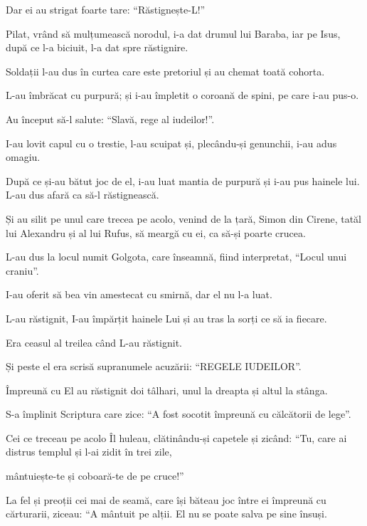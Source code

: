 {\par }{\PP Dar ei au strigat foarte tare: “Răstignește-L!”


\par }{\PP {}Pilat, vrând să mulțumească norodul, i-a dat drumul lui Baraba, iar pe Isus, după ce l-a biciuit, l-a dat spre răstignire.


\par }{\PP {}Soldații l-au dus în curtea care este pretoriul și au chemat toată cohorta.

L-au îmbrăcat cu purpură; și i-au împletit o coroană de spini, pe care i-au pus-o.

Au început să-l salute: “Slavă, rege al iudeilor!”.

I-au lovit capul cu o trestie, l-au scuipat și, plecându-și genunchii, i-au adus omagiu.

După ce și-au bătut joc de el, i-au luat mantia de purpură și i-au pus hainele lui. L-au dus afară ca să-l răstignească.


\par }{\PP {}Și au silit pe unul care trecea pe acolo, venind de la țară, Simon din Cirene, tatăl lui Alexandru și al lui Rufus, să meargă cu ei, ca să-și poarte crucea.

L-au dus la locul numit Golgota, care înseamnă, fiind interpretat, “Locul unui craniu”.

I-au oferit să bea vin amestecat cu smirnă, dar el nu l-a luat.


\par }{\PP {}L-au răstignit, I-au împărțit hainele Lui și au tras la sorți ce să ia fiecare.

Era ceasul al treilea când L-au răstignit.

Și peste el era scrisă supranumele acuzării: “REGELE IUDEILOR”.

Împreună cu El au răstignit doi tâlhari, unul la dreapta și altul la stânga.

S-a împlinit Scriptura care zice: “A fost socotit împreună cu călcătorii de lege”.


\par }{\PP {}Cei ce treceau pe acolo Îl huleau, clătinându-și capetele și zicând: “Tu, care ai distrus templul și l-ai zidit în trei zile,

mântuiește-te și coboară-te de pe cruce!”


\par }{\PP {}La fel și preoții cei mai de seamă, care își băteau joc între ei împreună cu cărturarii, ziceau: “A mântuit pe alții. El nu se poate salva pe sine însuși.

}
